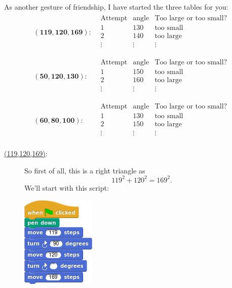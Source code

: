 \documentclass[noauthor,nooutcomes,12pt]{ximera}
\begin{document}
\begin{question}
     As another gesture of friendship, I have started the three tables
     for you:
     \[
     \begin{array}{rl}
       \mathbf{(119,120,169):} &
        \begin{array}{|c|c|c|c|}\hline
       \text{Attempt} & \text{angle} & \text{Too large or too small?} \\ \hline\hline
       1 & 130 & \text{too small} \\ \hline
       2 & 140 & \text{too large}  \\ \hline
       \vdots & \vdots & \vdots  \\ 
        \end{array} \\
        & \\
          \mathbf{(50,120,130):} & \begin{array}{|c|c|c|c|}\hline
            \text{Attempt} & \text{angle} & \text{Too large or too small?} \\ \hline\hline
            1 & 150 & \text{too small} \\ \hline
            2 & 160 & \text{too large}  \\ \hline
            \vdots & \vdots & \vdots  \\ 
     \end{array} \\
     & \\
       \mathbf{(60,80,100):}  &
        \begin{array}{|c|c|c|c|}\hline
       \text{Attempt} & \text{angle} & \text{Too large or too small?} \\ \hline\hline
       1 & 130 & \text{too small} \\ \hline
       2 & 150 & \text{too large}  \\ \hline
       \vdots & \vdots & \vdots  \\ 
        \end{array}
     \end{array}
     \]
     \begin{freeResponse}
       \begin{description}
       \item[\underline{(119,120,169)}:] So first of all, this is a right
        triangle as
        \[
        119^2 + 120^2 =169^2.
        \]
        We'll start with this script:
        \begin{center}
          \includegraphics{basicScriptRightBlank.png}

\end{center}
\end{description}
\end{freeResponse}
\end{question}
\end{document}

